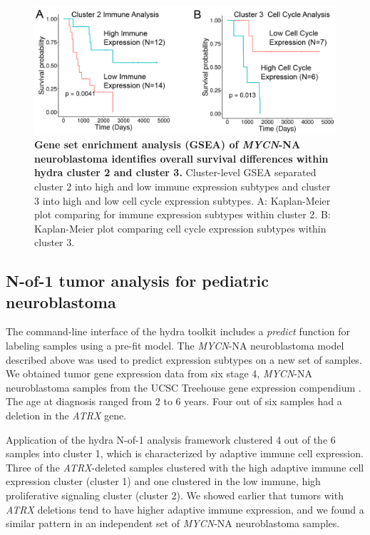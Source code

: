 \documentclass[10pt,letterpaper]{article}
\begin{document}
\begin{figure}[!h]
	\includegraphics[width=\textwidth]{img/PNG/SubCluster-Survival-V2-2x}
	\caption{{\bf Gene set enrichment analysis (GSEA) of \textit{MYCN}-NA neuroblastoma identifies overall survival differences within hydra cluster 2 and cluster 3.}
		Cluster-level GSEA separated cluster 2 into high and low immune expression subtypes and cluster 3 into high and low cell cycle expression subtypes. A: Kaplan-Meier plot comparing for immune expression subtypes within cluster 2. B: Kaplan-Meier plot comparing cell cycle expression subtypes within cluster 3.}
	\label{subcluster}
\end{figure}

\subsection*{N-of-1 tumor analysis for pediatric neuroblastoma}
The command-line interface of the hydra toolkit includes a \textit{predict} function for labeling samples using a pre-fit model. The \textit{MYCN}-NA neuroblastoma model described above was used to predict expression subtypes on a new set of samples. We obtained tumor gene expression data from six stage 4, \textit{MYCN}-NA neuroblastoma samples from the UCSC Treehouse gene expression compendium \cite{newtonTumorMapExploringMolecular2017, vaskeComparativeTumorRNA2019}. The age at diagnosis ranged from 2 to 6 years. Four out of six samples had a deletion in the \textit{ATRX} gene. 

Application of the hydra N-of-1 analysis framework clustered 4 out of the 6 samples into cluster 1, which is characterized by adaptive immune cell expression. Three of the \textit{ATRX}-deleted samples clustered with the high adaptive immune cell expression cluster (cluster 1) and one clustered in the low immune, high proliferative signaling cluster (cluster 2). We showed earlier that tumors with \textit{ATRX} deletions tend to have higher adaptive immune expression, and we found a similar pattern in an independent set of \textit{MYCN}-NA neuroblastoma samples. 
\end{document}
